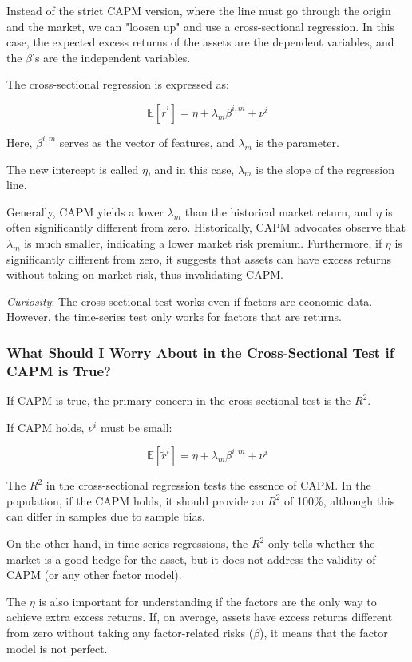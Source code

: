 \documentclass{article}
\begin{document}
Instead of the strict CAPM version, where the line must go through the origin and the market, we can "loosen up" and use a cross-sectional regression. In this case, the expected excess returns of the assets are the dependent variables, and the $\beta$'s are the independent variables.

The cross-sectional regression is expressed as:

$$
\mathbb{E}[\tilde{r}^i] = \eta + \lambda_m \beta^{i, m} + \nu^i
$$

Here, $\beta^{i, m}$ serves as the vector of features, and $\lambda_m$ is the parameter.

The new intercept is called $\eta$, and in this case, $\lambda_m$ is the slope of the regression line.

Generally, CAPM yields a lower $\lambda_m$ than the historical market return, and $\eta$ is often significantly different from zero. Historically, CAPM advocates observe that $\lambda_m$ is much smaller, indicating a lower market risk premium. Furthermore, if $\eta$ is significantly different from zero, it suggests that assets can have excess returns without taking on market risk, thus invalidating CAPM.

\textit{Curiosity}: The cross-sectional test works even if factors are economic data. However, the time-series test only works for factors that are returns.

\subsubsection{What Should I Worry About in the Cross-Sectional Test if CAPM is True?}

If CAPM is true, the primary concern in the cross-sectional test is the $R^2$.

If CAPM holds, $\nu^i$ must be small:

$$
\mathbb{E}[\tilde{r}^i] = \eta + \lambda_m \beta^{i, m} + \nu^i
$$


The $R^2$ in the cross-sectional regression tests the essence of CAPM. In the population, if the CAPM holds, it should provide an $R^2$ of 100\%, although this can differ in samples due to sample bias.

On the other hand, in time-series regressions, the $R^2$ only tells whether the market is a good hedge for the asset, but it does not address the validity of CAPM (or any other factor model).

The $\eta$ is also important for understanding if the factors are the only way to achieve extra excess returns. If, on average, assets have excess returns different from zero without taking any factor-related risks ($\beta$), it means that the factor model is not perfect.
\end{document}
